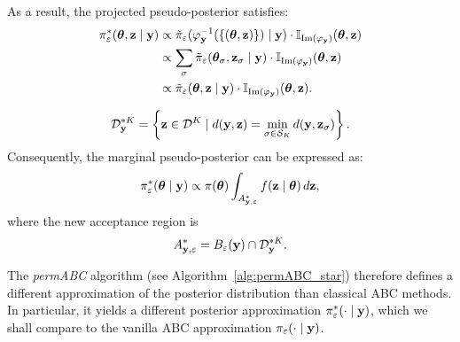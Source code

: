 As a result, the projected pseudo-posterior satisfies:
\begin{equation*}
    \begin{split}
        \pi_{\varepsilon}^* (\boldsymbol{\theta}, \mathbf{z} \mid \mathbf{y}) &  \propto \Tilde \pi_{\varepsilon} (\varphi_{\mathbf{y}}^{-1}(\{(\boldsymbol{\theta}, \mathbf{z})\}) \mid \mathbf{y})\cdot \mathbb I_{\text{Im}(\varphi_{\mathbf{y}})}(\boldsymbol{\theta},\mathbf{z})\\
        & \propto \sum_{\sigma} \Tilde \pi_{\varepsilon} (\boldsymbol{\theta}_{\sigma}, \mathbf{z}_{\sigma} \mid \mathbf{y})\cdot \mathbb I_{\text{Im}(\varphi_{\mathbf{y}})}(\boldsymbol{\theta},\mathbf{z})\\
        & \propto \tilde \pi_{\varepsilon}(\boldsymbol{\theta}, \mathbf{z}\mid \mathbf{y}) \cdot \mathbb I_{\text{Im}(\varphi_{\mathbf{y}})}(\boldsymbol{\theta},\mathbf{z}).
    \end{split}
\end{equation*}


\noindent {}
\[
\mathcal{D}_{\mathbf{y}}^{*K} = \left\{ \mathbf{z} \in \mathcal{D}^K \mid d(\mathbf{y}, \mathbf{z}) = \min_{\sigma \in \mathcal{S}_K} d(\mathbf{y}, \mathbf{z}_{\sigma}) \right\}.
\]
Consequently, the marginal pseudo-posterior can be expressed as:
\begin{equation}
\label{eqpermabc_star}
\pi_{\varepsilon}^*(\boldsymbol{\theta} \mid \mathbf{y}) \propto \pi(\boldsymbol{\theta}) \int_{A_{\mathbf{y},\varepsilon}^*} f(\mathbf{z} \mid \boldsymbol{\theta}) \, d\mathbf{z},
\end{equation}
where the new acceptance region is 
\[
A_{\mathbf{y},\varepsilon}^* = B_{\varepsilon}(\mathbf{y}) \cap \mathcal{D}_{\mathbf{y}}^{*K}.
\]

The \emph{permABC} algorithm (see Algorithm~\ref{alg:permABC_star}) therefore defines a different approximation of the posterior distribution than classical ABC methods. In particular, it yields a different posterior approximation  \( \pi_{\varepsilon}^*(\cdot \mid \mathbf{y}) \), which we shall compare to the vanilla ABC approximation \( \pi_{\varepsilon}(\cdot \mid \mathbf{y}) \).


